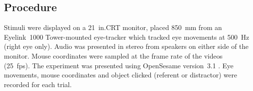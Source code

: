 \documentclass[a4paper,man,natbib]{apa6}
\begin{document}
%
%

\subsection{Procedure}
Stimuli were displayed on a 21~in.\@ CRT monitor, placed 850~mm from an Eyelink~1000 Tower-mounted eye-tracker which tracked eye movements at 500~Hz (right eye only). 
Audio was presented in stereo from speakers on either side of the monitor. 
Mouse coordinates were sampled at the frame rate of the videos (25~fps). 
The experiment was presented using OpenSesame version~3.1 \citep{Mathot2012}.
Eye movements, mouse coordinates and object clicked (referent or distractor) were recorded for each trial.

 
\end{document}
